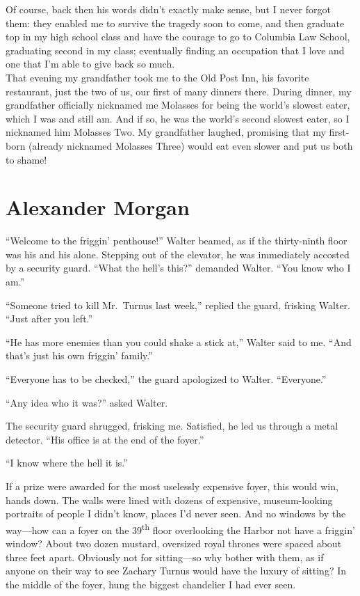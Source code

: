 Of course, back then his words didn't exactly make sense, but I never
forgot them: they enabled me to survive the tragedy soon to come, and
then graduate top in my high school class and have the courage to go to
Columbia Law School, graduating second in my class; eventually finding
an occupation that I love and one that I'm able to give back so much.\\

That evening my grandfather took me to the Old Post Inn, his favorite
restaurant, just the two of us, our first of many dinners there. During
dinner, my grandfather officially nicknamed me Molasses for being the
world's slowest eater, which I was and still am. And if so, he was the
world's second slowest eater, so I nicknamed him Molasses Two. My
grandfather laughed, promising that my first-born (already nicknamed
Molasses Three) would eat even slower and put us both to shame!

\chapter{Alexander Morgan}

\titlemark

``Welcome to the friggin' penthouse!'' Walter beamed, as if the
thirty-ninth floor was his and his alone. Stepping out of the elevator,
he was immediately accosted by a security guard. ``What the hell's
this?'' demanded Walter. ``You know who I am.''

``Someone tried to kill Mr.~Turnus last week,'' replied the guard,
frisking Walter. ``Just after you left.''

``He has more enemies than you could shake a stick at,'' Walter said to
me. ``And that's just his own friggin' family.''

``Everyone has to be checked,'' the guard apologized to Walter.
``Everyone.''

``Any idea who it was?'' asked Walter.

The security guard shrugged, frisking me. Satisfied, he led us through a
metal detector. ``His office is at the end of the foyer.''

``I know where the hell it is.''

If a prize were awarded for the most uselessly expensive foyer, this
would win, hands down. The walls were lined with dozens of expensive,
museum-looking portraits of people I didn't know, places I'd never seen.
And no windows by the way---how can a foyer on the
39\textsuperscript{th} floor overlooking the Harbor not have a friggin'
window? About two dozen mustard, oversized royal thrones were spaced
about three feet apart. Obviously not for sitting---so why bother with
them, as if anyone on their way to see Zachary Turnus would have the
luxury of sitting? In the middle of the foyer, hung the biggest
chandelier I had ever seen.

